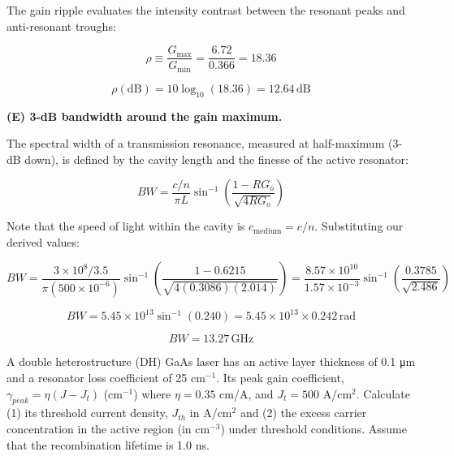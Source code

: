 The gain ripple evaluates the intensity contrast between the resonant peaks and anti-resonant troughs:

\begin{equation*}
  \rho \equiv \frac{G_{\text{max}}}{G_{\text{min}}} = \frac{6.72}{0.366} = 18.36
\end{equation*}

\begin{equation*}
  \boxed{\rho (\text{dB}) = 10 \log_{10}(18.36) = 12.64\,\text{dB}}
\end{equation*}

\textbf{(E) 3-dB bandwidth around the gain maximum.}

The spectral width of a transmission resonance, measured at half-maximum (3-dB down), is defined by the cavity length and the finesse of the active resonator:

\begin{equation*}
  BW = \frac{c / n}{\pi L} \sin^{-1}\left( \frac{1 - R G_o}{\sqrt{4 R G_o}} \right)
\end{equation*}

Note that the speed of light within the cavity is $c_{\text{medium}} = c/n$. Substituting our derived values:

\begin{equation*}
  BW = \frac{3 \times 10^8 / 3.5}{\pi (500 \times 10^{-6})} \sin^{-1}\left( \frac{1 - 0.6215}{\sqrt{4(0.3086)(2.014)}} \right) = \frac{8.57 \times 10^{10}}{1.57 \times 10^{-3}} \sin^{-1}\left( \frac{0.3785}{\sqrt{2.486}} \right)
\end{equation*}

\begin{equation*}
  BW = 5.45 \times 10^{13} \sin^{-1}(0.240) = 5.45 \times 10^{13} \times 0.242\,\text{rad}
\end{equation*}

\begin{equation*}
  \boxed{BW = 13.27\,\text{GHz}}
\end{equation*}

\begin{question}[Question 5]
A double heterostructure (DH) GaAs laser has an active layer thickness of 0.1 \si{\micro\meter} and a resonator loss coefficient of 25 cm$^{-1}$. Its peak gain coefficient, $\gamma_{peak} = \eta(J - J_t)$ (cm$^{-1}$) where $\eta = 0.35$ cm/A, and $J_t = 500$ A/cm$^2$. Calculate (1) its threshold current density, $J_{th}$ in A/cm$^2$ and (2) the excess carrier concentration in the active region (in cm$^{-3}$) under threshold conditions. Assume that the recombination lifetime is 1.0 ns.
\end{question}

